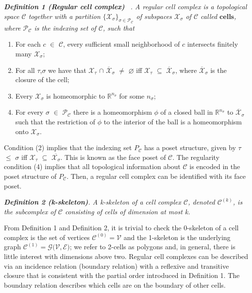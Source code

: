 \documentclass{article}
\begin{document}
\textit{\textbf{Definition 1 (Regular cell complex) }~\cite{hansen2019toward, bodnarcwnet}. A {\it regular cell complex} is a topological space $\mathcal{C}$ together with a partition $\{\mathcal{X}_{\sigma}\}_{\sigma \in \mathcal{P}_{\mathcal{C}}}$ of subspaces $\mathcal{X}_{\sigma}$ of $\mathcal{C}$ called $\mathbf{cells}$, where $\mathcal{P}_{\mathcal{C}}$ is the indexing set of $\mathcal{C}$, such that}

\begin{enumerate}
    \item For each $c$ $\in$  $\mathcal{C}$, every sufficient small neighborhood of $c$ intersects finitely many $\mathcal{X}_{\sigma}$;  
    \item For all $\mathcal{\tau}$,$\mathcal{\sigma}$ we have that $\mathcal{X}_{\tau}$ $\cap$ $\overline{\mathcal{X}}_{\sigma}$ $\neq$ $\varnothing$ iff $\mathcal{X}_{\tau}$ $\subseteq$ $\overline{\mathcal{X}}_{\sigma}$, where $\overline{\mathcal{X}}_{\sigma}$ is the closure of the cell;
    \item Every $\mathcal{X}_{\sigma}$ is homeomorphic to $\mathbb{R}^{n_{\sigma}}$ for some $n_{\sigma}$;
    \item For every $\sigma$ $\in$ $\mathcal{P}_{\mathcal{C}}$ there is a homeomorphism $\phi$ of a closed ball in $\mathbb{R}^{{n}_{\sigma}}$ to $\overline{\mathcal{X}}_{\sigma}$ such that the restriction of $\phi$ to the interior of the ball is a homeomorphism onto $\mathcal{X}_{\sigma}$.
\end{enumerate}


Condition (2) implies that the indexing set $P_{\mathcal{C}}$ has a poset structure, given by $\tau$ $\leq$ $\sigma$ iff $\mathcal{X}_{\tau}$ $\subseteq$ $\overline{\mathcal{X}_\sigma}$. This is known as the face poset of $\mathcal{C}$. The regularity condition (4) implies that all topological information about $\mathcal{C}$ is encoded in the poset structure of $P_{\mathcal{C}}$. Then, a regular cell complex can be identified with its face poset. 




\textit{\textbf{Definition 2 (k-skeleton)}. A {\it k-skeleton} of a cell complex $\mathcal{C}$, denoted $\mathcal{C}^{(k)}$, is the subcomplex of $\mathcal{C}$ consisting of cells of dimension at most k.}

From Definition 1 and Definition 2, it is trivial to check the 0-skeleton of a cell complex is the set of vertices $\mathcal{C}^{(0)} = \mathcal{V}$ and the 1-skeleton is the underlying graph $\mathcal{C}^{(1)}=\mathcal{G}(\mathcal{V},\mathcal{E)}$; we refer to 2-cells as polygons and, in general, there is little interest with dimensions above two. Regular cell complexes can be described via an incidence relation (boundary relation) with a  reflexive and transitive closure that is consistent with the partial order introduced in Definition 1. The boundary relation describes which cells are on the boundary of other cells.
\end{document}

